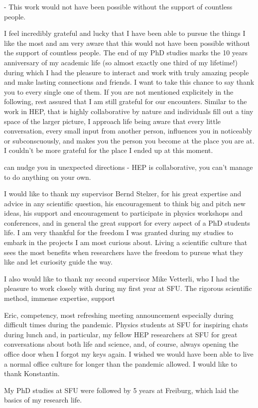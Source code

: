 - This work would not have been possible without the support of countless people.

I feel incredibly grateful and lucky that I have been able to pursue the things I like the most and am very aware that this would not have been possible without the support of countless people.
The end of my PhD studies marks the 10 years anniversary of my academic life (so almost exactly one third of my lifetime!) during which I had the pleasure to interact and work with truly amazing people and make lasting connections and friends.
I want to take this chance to say thank you to every single one of them. If you are not mentioned explicitely in the following, rest assured that I am still grateful for our encounters. Similar to the work in HEP, that is highly collaborative by nature and individuals fill out a tiny space of the larger picture, I approach life being aware that every little conversation, every small input from another person, influences you in noticeably or subconscuously, and makes you the person you become at the place you are at. I couldn't be more grateful for the place I ended up at this moment. 

can nudge you in unexpected directions 
- HEP is collaborative, you can't manage to do anything on your own.

I would like to thank my supervisor Bernd Stelzer, for his great expertise and advice in any scientific question, his encouragement to think big and pitch new ideas, his support and encouragement to participate in physics workshops and conferences, and in general the great support for every aspect of a PhD students life. I am very thankful for the freedom I was granted during my studies to embark in the projects I am most curious about. 
Living a scientific culture that sees the most benefits when researchers have the freedom to pursue what they like and let curiosity guide the way. 

I also would like to thank my second supervisor Mike Vetterli, who I had the pleasure to work closely with during my first year at SFU. 
The rigorous scientific method, immense expertise, support

Eric, competency, most refreshing meeting announcement especially during difficult times during the pandemic.
Physics students at SFU for inspiring chats during lunch and, in particular, my fellow HEP researchers at SFU for great conversations about both life and science, and, of course, always opening the office door when I forgot my keys again. I wished we would have been able to live a normal office culture for longer than the pandemic allowed. 
I would like to thank Konstantin. 

My PhD studies at SFU were followed by 5 years at Freiburg, which laid the basics of my research life.
